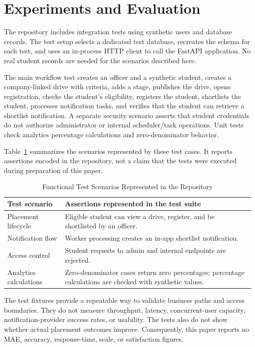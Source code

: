 \documentclass[conference,final]{IEEEtran}
\begin{document}
\section{Experiments and Evaluation}
The repository includes integration tests using synthetic users and database records. The test setup selects a dedicated test database, recreates the schema for each test, and uses an in-process HTTP client to call the FastAPI application. No real student records are needed for the scenarios described here.

The main workflow test creates an officer and a synthetic student, creates a company-linked drive with criteria, adds a stage, publishes the drive, opens registration, checks the student's eligibility, registers the student, shortlists the student, processes notification tasks, and verifies that the student can retrieve a shortlist notification. A separate security scenario asserts that student credentials do not authorize administrator or internal scheduler/task operations. Unit tests check analytics percentage calculations and zero-denominator behavior.

Table~\ref{tab:evaluation} summarizes the scenarios represented by these test cases. It reports assertions encoded in the repository, not a claim that the tests were executed during preparation of this paper.

\begin{table}[t]
\caption{Functional Test Scenarios Represented in the Repository}
\label{tab:evaluation}
\centering
\small
\begin{tabular}{p{} p{}}
\toprule
\textbf{Test scenario} & \textbf{Assertions represented in the test suite} \\
\midrule
Placement lifecycle & Eligible student can view a drive, register, and be shortlisted by an officer. \\
Notification flow & Worker processing creates an in-app shortlist notification. \\
Access control & Student requests to admin and internal endpoints are rejected. \\
Analytics calculations & Zero-denominator cases return zero percentages; percentage calculations are checked with synthetic values. \\
\bottomrule
\end{tabular}
\end{table}

The test fixtures provide a repeatable way to validate business paths and access boundaries. They do not measure throughput, latency, concurrent-user capacity, notification-provider success rates, or usability. The tests also do not show whether actual placement outcomes improve. Consequently, this paper reports no MAE, accuracy, response-time, scale, or satisfaction figures.
\end{document}
